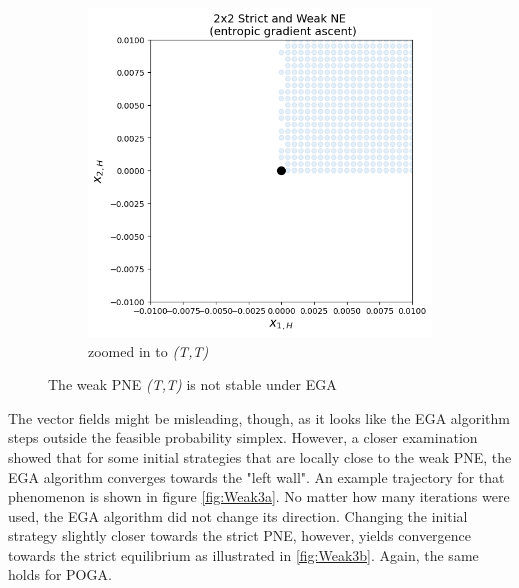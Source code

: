 \begin{figure}[H]
\begin{subfigure}{.52\textwidth}
    \includegraphics[width=\textwidth]{logos/Weak4.png}
    \caption{zoomed in to \textit{(T,T)}}
    \label{fig:Weak2b}
\end{subfigure}
\caption{The weak PNE \textit{(T,T)} is not stable under EGA}
\label{fig:2x2Weak2}
\end{figure}

The vector fields might be misleading, though, as it looks like the EGA algorithm steps outside the feasible probability simplex. However, a closer examination showed that for some initial strategies that are locally close to the weak PNE, the EGA algorithm converges towards the "left wall". An example trajectory for that phenomenon is shown in figure \ref{fig:Weak3a}. No matter how many iterations were used, the EGA algorithm did not change its direction. Changing the initial strategy slightly closer towards the strict PNE, however, yields convergence towards the strict equilibrium as illustrated in \ref{fig:Weak3b}. Again, the same holds for POGA.

